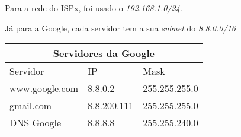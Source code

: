 Para a rede do ISPx, foi usado o \textit{192.168.1.0/24}.

Já para a Google, cada servidor tem a sua \textit{subnet} do \textit{8.8.0.0/16}

\vspace{3mm}
\setlength{\tabcolsep}{20pt}
\renewcommand{\arraystretch}{1.5}
\noindent
\begin{tabular}{ |p{3cm}|p{2cm}|p{2cm}|}
  \hline
  \multicolumn{3}{|c|}{Servidores da Google}   \\
  \hline
  Servidor       & IP          & Mask          \\
  \hline
  www.google.com & 8.8.0.2     & 255.255.255.0 \\
  gmail.com      & 8.8.200.111 & 255.255.255.0 \\
  DNS Google     & 8.8.8.8     & 255.255.240.0 \\
  \hline
\end{tabular}
\vspace{5mm}

